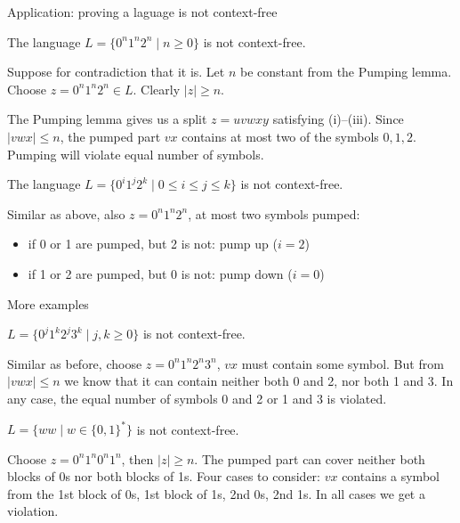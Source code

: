 \documentclass[handout]{beamer}
\begin{document}
\begin{frame}{Application: proving a laguage is not context-free}

	\begin{example}
		The language $L=\{0^n1^n2^n\mid n\geq 0\}$ is not context-free.
	\end{example}
	Suppose for contradiction that it is. Let $n$ be constant from the Pumping lemma. Choose $z=0^n1^n2^n\in L$. Clearly $|z|\geq n$.

	The Pumping lemma gives us a split $z=uvwxy$ satisfying (i)--(iii). Since $|vwx|\leq n $, the pumped part $vx$ contains at most two of the symbols $0,1,2$. Pumping will violate equal number of symbols.\hfill\qedsymbol

	\medskip

	\begin{example}
		The language $L=\{0^i1^j2^k\mid 0\leq i\leq j\leq k\}$ is not context-free.
	\end{example}
	Similar as above, also $z=0^n1^n2^n$, at most two symbols pumped:
	\begin{itemize}
		\item if 0 or 1 are pumped, but 2 is not: pump up ($i=2$)
		\item if 1 or 2 are pumped, but 0 is not: pump down ($i=0$)\hfill\qedsymbol

	\end{itemize}
\end{frame}


\begin{frame}{More examples}

	\begin{example}
		$L=\{0^j1^k2^j3^k\mid j,k\geq 0\}$ is not context-free.
	\end{example}		
	Similar as before, choose $z=0^n1^n2^n3^n$, $vx$ must contain some symbol. But from $|vwx|\leq n$ we know that it can contain neither both 0 and 2, nor both 1 and 3. In any case, the equal number of symbols 0 and 2 or 1 and 3 is violated.\hfill\qedsymbol

	\bigskip

	\begin{example}
		$L=\{ww\mid w\in\{0,1\}^*\}$ is not context-free.
	\end{example}	
	Choose $z=0^n1^n0^n1^n$, then $|z|\geq n$. The pumped part can cover neither both blocks of 0s nor both blocks of 1s. Four cases to consider: $vx$ contains a symbol from the 1st block of 0s, 1st block of 1s, 2nd 0s, 2nd 1s. In all cases we get a violation.\hfill\qedsymbol

\end{frame}
\end{document}
